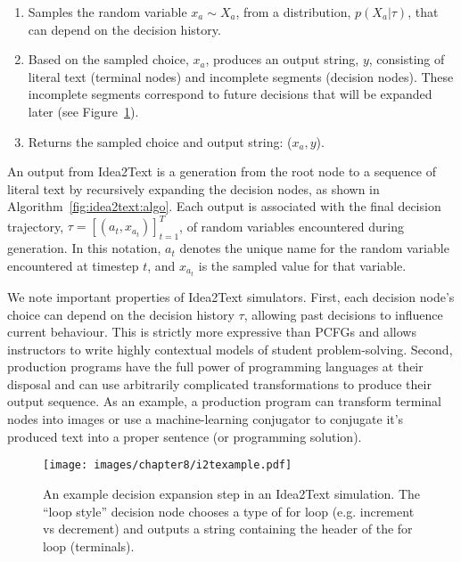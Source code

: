 \begin{enumerate}[label=(\arabic*)]
    \item Samples the random variable $x_a \sim X_a$, from a distribution, $p(X_a | \tau)$, that can depend on the decision history. 
    \item Based on the sampled choice, $x_a$, produces an output string, $y$, consisting of literal text (terminal nodes) and incomplete segments (decision nodes). These incomplete segments correspond to future decisions that will be expanded later (see Figure~\ref{fig:example}).
    \item Returns the sampled choice and output string: ($x_a, y$).
\end{enumerate}

An output from Idea2Text is a generation from the root node to a sequence of literal text by recursively expanding the decision nodes, as shown in Algorithm~\ref{fig:idea2text:algo}.
Each output is associated with the final decision trajectory, $\tau = [(a_t, x_{a_t})]_{t=1}^T$, of random variables encountered during generation. In this notation, $a_t$ denotes the unique name for the random variable encountered at timestep $t$, and $x_{a_t}$ is the sampled value for that variable. 

We note important properties of Idea2Text simulators. First, each decision node's choice can depend on the decision history $\tau$, allowing past decisions to influence current behaviour. This is strictly more expressive than PCFGs \cite{wu2018zero} and allows instructors to write highly contextual models of student problem-solving. Second, production programs have the full power of programming languages at their disposal and can use arbitrarily complicated transformations to produce their output sequence. As an example, a production program can transform terminal nodes into images or use a machine-learning conjugator to conjugate it's produced text into a proper sentence (or programming solution).

\begin{figure}[h!]
    \centering
    \texttt{[image: images/chapter8/i2texample.pdf]}
    \caption{An example decision expansion step in an Idea2Text simulation. The ``loop style'' decision node chooses a type of for loop (e.g. increment vs decrement) and outputs a string containing the header of the for loop (terminals).}
    \label{fig:example}
\end{figure}

